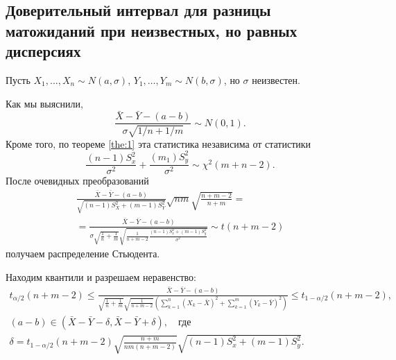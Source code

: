 \subsection{Доверительный интервал для разницы матожиданий при неизвестных, но равных дисперсиях}
\begin{ex}[для $\Delta a$ при неизвестном $ \sigma_1 = \sigma_2 $]
Пусть $X_1, \dots, X_n \sim N(a, \sigma)$, $Y_1, \dots, Y_m \sim N(b, \sigma)$,
но $\sigma$ неизвестен.

Как мы выяснили,
\[
  \frac{\bar X - \bar Y - (a-b)}{\sigma \sqrt{1/n + 1/m}} \sim N(0, 1).
\]
Кроме того, по теореме \ref{the:1} эта статистика независима от статистики
\[
	\frac{(n-1)S_x^2}{\sigma^2} + \frac{(m_1) S_y^2}{\sigma^2} \sim \chi^2(m+n-2).
\]
После очевидных преобразований 
\begin{multline*}
	\frac{\bar X - \bar Y - (a-b)}{\sqrt{(n-1)S^2_X+(m-1)S^2_Y}} \sqrt{nm}
	\sqrt{\frac{n+m -2}{n+m}}= \\ =
	\frac{\bar X - \bar Y - (a-b)}{\sigma\sqrt{\frac1n + \frac1m}
	\sqrt{\frac{1}{n+m-2} \frac{(n-1) S_x^2 + (m-1)S_y^2}{\sigma^2}}} \sim
	t(n+m-2)
\end{multline*}
получаем распределение Стьюдента.

Находим квантили и разрешаем неравенство:
\begin{gather*}
	t_{\alpha/2}(n+m-2) \leqslant \frac{\bar X - \bar Y - (a-b)}{\sqrt{
	\frac{1}{n}+ \frac{1}{m}} \sqrt{ \frac{1}{n+m - 2}} \left( \sum_{k=1}^n \left(
X_k - \bar X\right)^2 + \sum_{k=1}^m \left( Y_k - \bar Y \right)^2 \right) }
\leqslant t_{1-\alpha/2} (n+m-2),\\
	(a-b) \in (\bar X - \bar Y - \delta, \bar X - \bar Y + \delta), \quad
	\text{где}\\
\delta = t_{1-\alpha/2} (n+m-2) \sqrt{\frac{n+m}{nm(n+m-2)}} \sqrt{(n-1)S_x^2 +
(m-1) S_y^2}.
\end{gather*}
\end{ex}

